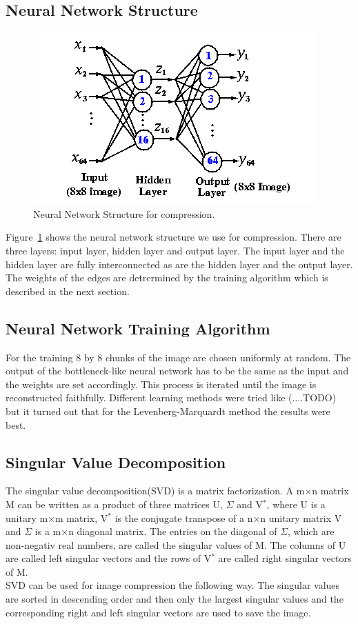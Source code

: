 \documentclass[10pt,conference,compsocconf]{IEEEtran}
\begin{document}
\subsection{Neural Network Structure}
\begin{figure}[tbp]
  \centering
  \includegraphics[width=\columnwidth]{nnStructure}
  \caption{Neural Network Structure for compression.}
  \label{fig:nnStructure}
\end{figure}

Figure~\ref{fig:nnStructure} shows the neural network structure we use for compression. There are three layers: input layer, hidden layer and output layer. The input layer and the hidden layer are fully interconnected as are the hidden layer and the output layer. The weights of the edges are detrermined by the training algorithm which is described in the next section. 

\subsection{Neural Network Training Algorithm}
For the training 8 by 8 chunks of the image are chosen uniformly at random. The output of the bottleneck-like neural network has to be the same as the input and the weights are set accordingly. This process is iterated until the image is reconstructed faithfully.  
Different learning methods were tried like (....TODO) but it turned out that for the Levenberg-Marquardt method the results were best. 
\subsection{Singular Value Decomposition}
The singular value decomposition(SVD) is a matrix factorization. A m$\times$n matrix M can be written as a product of three matrices U, $\Sigma$ and V$^*$, where U is a unitary m$\times$m matrix, V$^*$ is the conjugate transpose of a n$\times$n unitary matrix V and $\Sigma$ is a m$\times$n diagonal matrix. The entries on the diagonal of $\Sigma$, which are non-negativ real numbers, are called the singular values of M. The columns of U are called left singular vectors and the rows of V$^*$ are called right singular vectors of M. \\
SVD can be used for image compression the following way. The singular values are sorted in descending order and then only the largest singular values and the corresponding right and left singular vectors are used to save the image.
\end{document}
